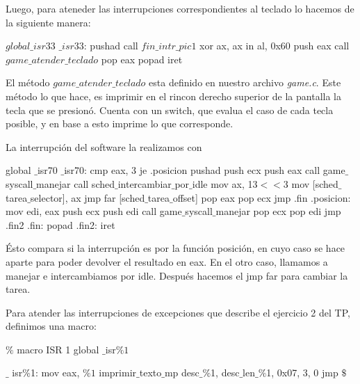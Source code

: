 Luego, para ateneder las interrupciones correspondientes al teclado lo hacemos de la siguiente manera:
\begin{algorithmic}
    \State \tab $global \_isr33$
\State \tab \tab $\_isr33$:
  \State \tab \tab pushad
  \State \tab \tab call $fin\_intr\_pic1$
  \State \tab \tab xor ax, ax
  \State \tab \tab in al, 0x60
  \State \tab \tab push eax
  \State \tab \tab call $game\_atender\_teclado$
  \State \tab \tab pop eax
  \State \tab \tab popad
  \State \tab \tab iret
\end{algorithmic}

El m\'etodo \textit{$game\_atender\_teclado$} esta definido en nuestro archivo \textit{game.c}. Este m\'etodo lo que hace, es imprimir en el rincon derecho superior de la pantalla la tecla que se presion\'o.
Cuenta con un switch, que evalua el caso de cada tecla posible, y en base a esto imprime lo que corresponde.

La interrupción del software la realizamos con
\begin{algorithmic}
\State global $\_$isr70
\State $\_$isr70:
\State \tab cmp eax, 3
\State \tab je .posicion
\State \tab pushad
\State \tab push ecx
\State \tab push eax
\State \tab call game$\_$syscall$\_$manejar
\State \tab call sched$\_$intercambiar$\_$por$\_$idle
\State \tab mov ax, 13$<<$3
\State \tab mov [sched$\_$tarea$\_$selector], ax
\State \tab jmp far [sched$\_$tarea$\_$offset]
\State \tab pop eax
\State \tab pop ecx
\State \tab jmp .fin
\State .posicion:
\State \tab mov edi, eax
\State \tab push ecx
\State \tab push edi
\State \tab call game$\_$syscall$\_$manejar
\State \tab pop ecx
\State \tab pop edi
\State \tab jmp .fin2
\State .fin:
\State \tab popad
\State .fin2:
\State \tab iret
\end{algorithmic}
Ésto compara si la interrupción es por la función posición, en cuyo caso se hace aparte para poder devolver el resultado en eax. En el otro caso, llamamos a manejar e intercambiamos por idle. Después hacemos el jmp far para cambiar la tarea.

Para atender las interrupciones de excepciones que describe el ejercicio 2 del TP, definimos una macro:
\begin{algorithmic}
\State \tab $\%$ macro ISR 1
\State \tab global $\_$isr$\%1$

\State \tab $\_$ isr$\%$1:
    \State \tab \tab mov eax, $\%1$
    \State \tab \tab imprimir$\_$texto$\_$mp desc$\_\%$1, desc$\_$len$\_\%$1, 0x07, 3, 0
    \State \tab \tab jmp $\$$

\State \tab %
\end{algorithmic}


